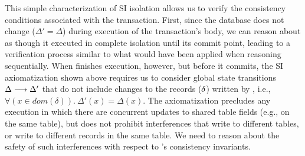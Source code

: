 
\noindent This simple characterization of SI isolation allows us to
verify the consistency conditions associated with the 
transaction.  First, since the database does not change ($\Delta' =
\Delta$) during execution of the transaction's body, we can reason
about  as though it executed in complete isolation until
its commit point, leading to a verification process similar to what
would have been applied when reasoning sequentially.  When
 finishes execution, however, but before it commits, the
SI axiomatization shown above requires us to consider global state
transitions $\Delta \longrightarrow \Delta'$ that do not include changes
to the records ($\delta$) written by , i.e.,
$\forall(x\in\mathit{dom}(\delta)).~\Delta'(x) = \Delta(x)$.  The
axiomatization precludes any execution in which there are concurrent
updates to shared table fields (e.g.,  on the same
 table), but does not prohibit interferences that write to
different tables, or write to different records in the same table.  We
need to reason about the safety of such interferences with respect to
's consistency invariants.

